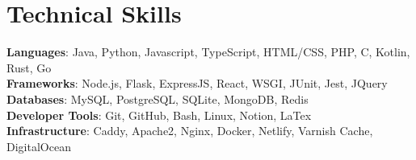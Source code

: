 \documentclass[letterpaper,11pt]{article}
\newcommand{\resumeSubHeadingListStart}{\begin{itemize}[leftmargin=0.15in, label={}]}
\begin{document}
  \section{Technical Skills}
\begin{itemize}[leftmargin=0.15in, label={}]
   \small{\item{
    \textbf{Languages}{:  Java, Python, Javascript, TypeScript, HTML/CSS, PHP, C, Kotlin, Rust, Go} \\
    \textbf{Frameworks}{: Node.js, Flask, ExpressJS, React, WSGI, JUnit, Jest, JQuery} \\
    \textbf{Databases}{: MySQL, PostgreSQL, SQLite, MongoDB, Redis} \\
    \textbf{Developer Tools}{: Git, GitHub, Bash, Linux, Notion, LaTex} \\
    \textbf{Infrastructure}{: Caddy, Apache2, Nginx, Docker, Netlify, Varnish Cache, DigitalOcean}
    }}
\end{itemize}

    
\end{document}
